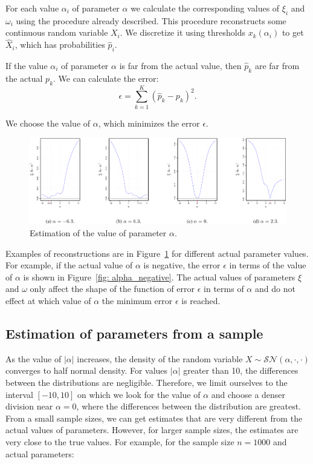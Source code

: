 \documentclass[10pt]{article}
\begin{document}
For each value $\alpha_{i}$ of parameter $\alpha$ we calculate the corresponding values of $\xi_{i}$ and $\omega_{i}$ using the procedure already described. This procedure reconstructs some continuous random variable $X_{i}$. We discretize it using thresholds $x_{k}(\alpha_{i})$ to get $\hat{X}_{i}$, which has probabilities $\hat{p}_{i}$.

If the value $\alpha_{i}$ of parameter $\alpha$ is far from the actual value, then $\hat{p}_{k}$ are far from the actual $p_{k}$. We can calculate the error: 
\begin{equation}
\epsilon = \sum_{k=1}^{K} (\hat{p}_{k} - p_{k})^{2}.
\end{equation}

We choose the value of $\alpha$, which minimizes the error $\epsilon$. 

\begin{figure}[H]
\centering
\includegraphics[width=\linewidth]{parameter-alpha-cropped.pdf}
\caption{ Estimation of the value of parameter $\alpha$.}
\label{fig: alpha_reconstruction}
\end{figure}

Examples of reconstructions are in Figure~\ref{fig: alpha_reconstruction} for different actual parameter values. For example, if the actual value of $\alpha$ is negative, the error $\epsilon$ in terms of the value of $\alpha$ is shown in Figure~\ref{fig: alpha_negative}. The actual values of parameters $\xi$ and $\omega$ only affect the shape of the function of error $\epsilon$ in terms of $\alpha$ and do not effect at which value of $\alpha$ the minimum error $\epsilon$ is reached.

\subsection{Estimation of parameters from a sample}
As the value of $|\alpha|$ increases, the density of the random variable $X \sim \mathcal{SN}(\alpha, \cdot, \cdot)$ converges to half normal density. For values $|\alpha|$ greater than 10, the differences between the distributions are negligible. Therefore, we limit ourselves to the interval $[-10, 10]$ on which we look for the value of $\alpha$ and choose a denser division near $\alpha = 0$, where the differences between the distribution are greatest. From a small sample sizes, we can get estimates that are very different from the actual values of parameters. However, for larger sample sizes, the estimates are very close to the true values. For example, for the sample size $n=1000$ and actual parameters:
\end{document}
